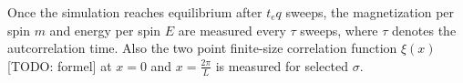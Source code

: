 Once the simulation reaches equilibrium after \(t_eq\) sweeps,
the magnetization per spin \(m\) and energy per spin \(E\) are measured
every \(\tau\) sweeps, where \(\tau\) denotes the autcorrelation time.
Also the two point finite-size correlation function \(\xi(x)\) \cite{} [TODO: formel]
at \(x=0\) and \(x=\frac{2\pi}{L}\) is measured for selected \(\sigma\).
